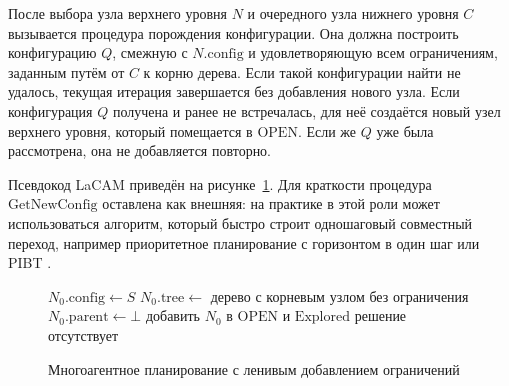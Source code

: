 После выбора узла верхнего уровня $N$ и очередного узла нижнего уровня $C$ вызывается процедура
порождения конфигурации. Она должна построить конфигурацию $Q$, смежную с $N.\mathrm{config}$ и
удовлетворяющую всем ограничениям, заданным путём от $C$ к корню дерева. Если такой конфигурации
найти не удалось, текущая итерация завершается без добавления нового узла. Если конфигурация $Q$
получена и ранее не встречалась, для неё создаётся новый узел верхнего уровня, который помещается в
$\mathrm{OPEN}$. Если же $Q$ уже была рассмотрена, она не добавляется повторно.

Псевдокод LaCAM приведён на рисунке~\ref{alg:lacam}. Для краткости процедура
$\mathrm{GetNewConfig}$ оставлена как внешняя: на практике в этой роли может использоваться алгоритм,
который быстро строит одношаговый совместный переход, например приоритетное планирование с горизонтом
в один шаг или PIBT \cite{pibt}.

\begin{figure}
\begin{minipage}{\linewidth}
\begin{algorithm}[H]
    \SetAlgoVlined
    $N_0.\mathrm{config} \leftarrow S$\;
    $N_0.\mathrm{tree} \leftarrow$ дерево с корневым узлом без ограничения\;
    $N_0.\mathrm{parent} \leftarrow \bot$\;
    добавить $N_0$ в $\mathrm{OPEN}$ и $\mathrm{Explored}$\;
    \Return решение отсутствует\;
\end{algorithm}
\end{minipage}
\caption{Многоагентное планирование с ленивым добавлением ограничений}
\label{alg:lacam}
\end{figure}


